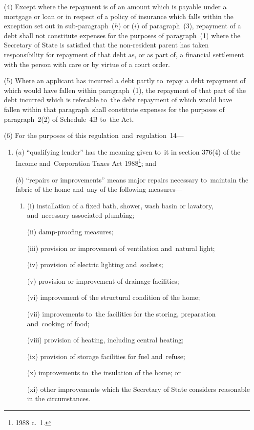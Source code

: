 \documentclass[12pt,a4paper]{article}
\begin{document}
(4) Except where the repayment is of an amount which is payable under a mortgage or loan or in respect of a policy of insurance which falls within the exception set out in sub-paragraph~($h$)  or ($i$)  of paragraph~(3), repayment of a debt shall not constitute expenses for the purposes of paragraph~(1) where the Secretary of State is satisfied that the non-resident parent has taken responsibility for repayment of that debt as, or as part of, a financial settlement with the person with care or by virtue of a court order.

(5) Where an applicant has incurred a debt partly to~repay a debt repayment of which would have fallen within paragraph~(1), the repayment of that part of the debt incurred which is referable to~the debt repayment of which would have fallen within that paragraph~shall constitute expenses for the purposes of paragraph~2(2) of Schedule~4B to~the Act.

(6) For the purposes of this regulation~and~regulation~14—
\begin{enumerate}\item[]
($a$) “qualifying lender” has the meaning given to~it in section 376(4) of the Income and~Corporation Taxes Act 1988\footnote{1988 c.\ 1.}; and

($b$) “repairs or improvements” means major repairs necessary to~maintain the fabric of the home and~any of the following measures—
\begin{enumerate}\item[]
(i) installation of a fixed bath, shower, wash basin or lavatory, and~necessary associated plumbing;

(ii) damp-proofing measures;

(iii) provision or improvement of ventilation and~natural light;

(iv) provision of electric lighting and~sockets;

(v) provision or improvement of drainage facilities;

(vi) improvement of the structural condition of the home;

(vii) improvements to~the facilities for the storing, preparation and~cooking of food;

(viii) provision of heating, including central heating;

(ix) provision of storage facilities for fuel and~refuse;

(x) improvements to~the insulation of the home; or

(xi) other improvements which the Secretary of State considers reasonable in the circumstances.
\end{enumerate}
\end{enumerate}
\end{document}
